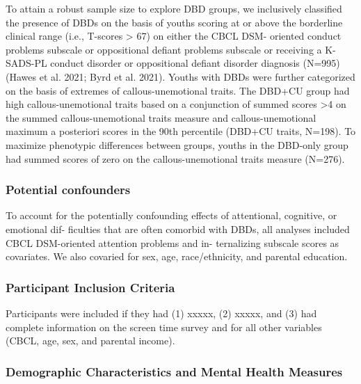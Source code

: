 \documentclass{article}
\begin{document}
To attain a robust sample size to explore DBD groups, we inclusively
classified the presence of DBDs on the basis of youths scoring at or
above the borderline clinical range (i.e., T-scores \textgreater{} 67)
on either the CBCL DSM- oriented conduct problems subscale or
oppositional defiant problems subscale or receiving a K-SADS-PL conduct
disorder or oppositional defiant disorder diagnosis (N=995) (Hawes et
al. 2021; Byrd et al. 2021). Youths with DBDs were further categorized
on the basis of extremes of callous-unemotional traits. The DBD+CU group
had high callous-unemotional traits based on a conjunction of summed
scores \textgreater4 on the summed callous-unemotional traits measure
and callous-unemotional maximum a posteriori scores in the 90th
percentile (DBD+CU traits, N=198). To maximize phenotypic differences
between groups, youths in the DBD-only group had summed scores of zero
on the callous-unemotional traits measure (N=276).

\hypertarget{potential-confounders}{%
\subsubsection{Potential confounders}\label{potential-confounders}}

To account for the potentially confounding effects of attentional,
cognitive, or emotional dif- ficulties that are often comorbid with
DBDs, all analyses included CBCL DSM-oriented attention problems and in-
ternalizing subscale scores as covariates. We also covaried for sex,
age, race/ethnicity, and parental education.

\hypertarget{participant-inclusion-criteria}{%
\subsubsection{Participant Inclusion
Criteria}\label{participant-inclusion-criteria}}

Participants were included if they had (1) xxxxx, (2) xxxxx, and (3) had
complete information on the screen time survey and for all other
variables (CBCL, age, sex, and parental income).

\hypertarget{demographic-characteristics-and-mental-health-measures}{%
\subsubsection{Demographic Characteristics and Mental Health
Measures}\label{demographic-characteristics-and-mental-health-measures}}
\end{document}
